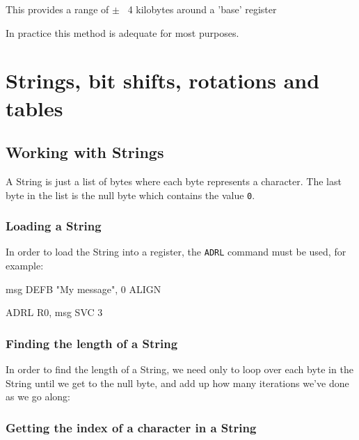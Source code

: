 This provides a range of $\pm$ ~4 kilobytes around a 'base' register

In practice this method is adequate for most purposes. 

\section{Strings, bit shifts, rotations and tables}

\subsection{Working with Strings}

A String is just a list of bytes where each byte represents a character. The
last byte in the list is the null byte which contains the value {\tt 0}.

\subsubsection{Loading a String}

In order to load the String into a register, the {\tt ADRL} command must be
used, for example:

\begin{listing}{1}
msg	DEFB 	"My message", 0
	ALIGN

	ADRL 	R0, msg
	SVC 	3
\end{listing}

\subsubsection{Finding the length of a String}

In order to find the length of a String, we need only to loop over each byte in
the String until we get to the null byte, and add up how many iterations we've
done as we go along:



\subsubsection{Getting the index of a character in a String}

